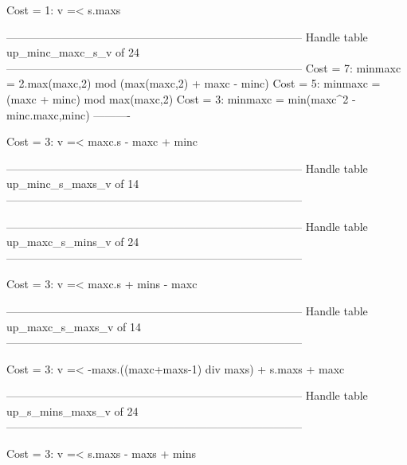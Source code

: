 Cost =  1:  v =< s.maxs

--------------------------------------------------------------------------------
Handle table up_minc_maxc_s_v of 24
--------------------------------------------------------------------------------
Cost =  7:  minmaxc = 2.max(maxc,2) mod (max(maxc,2) + maxc - minc)
Cost =  5:  minmaxc = (maxc + minc) mod max(maxc,2)
Cost =  3:  minmaxc = min(maxc^2 - minc.maxc,minc)
----------

Cost =  3:  v =< maxc.s - maxc + minc

--------------------------------------------------------------------------------
Handle table up_minc_s_maxs_v of 14
--------------------------------------------------------------------------------


--------------------------------------------------------------------------------
Handle table up_maxc_s_mins_v of 24
--------------------------------------------------------------------------------

Cost =  3:  v =< maxc.s + mins - maxc

--------------------------------------------------------------------------------
Handle table up_maxc_s_maxs_v of 14
--------------------------------------------------------------------------------

Cost =  3:  v =< -maxs.((maxc+maxs-1) div maxs) + s.maxs + maxc

--------------------------------------------------------------------------------
Handle table up_s_mins_maxs_v of 24
--------------------------------------------------------------------------------

Cost =  3:  v =< s.maxs - maxs + mins
